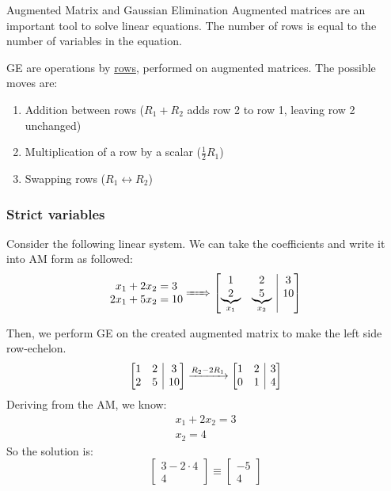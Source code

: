 \documentclass{article}
\makeatletter
\newenvironment{amatrix}[1]{%
  \left[\begin{array}{@{}*{#1}{c}|c@{}}
}{%
  \end{array}\right]
}
\makeatother
\begin{document}
\begin{knBox}[]{Augmented Matrix and Gaussian Elimination}
    Augmented matrices are an important tool to solve linear equations. The number of rows is equal to the number of variables in the equation. 

    GE are operations by \underline{rows}, performed on augmented matrices. The possible moves are:
    \begin{enumerate}
        \item Addition between rows ($R_1 + R_2$ adds row 2 to row 1, leaving row 2 unchanged)
        \item Multiplication of a row by a scalar ($\frac{1}{2}R_1$)
        \item Swapping rows ($R_1\leftrightarrow R_2$)
    \end{enumerate}
\end{knBox}

\subsubsection{Strict variables}
Consider the following linear system. We can take the coefficients and write it into AM form as followed:
\[
\begin{matrix}
    x_1 + 2x_2 = 3\\
    2x_1 + 5x_2 = 10
\end{matrix}\xRightarrow{\hspace{0.5cm}}
\begin{amatrix}{2}
    1 & 2 & 3 \\ \underbrace{2}_{x_1} & \underbrace{5}_{x_2} & 10
\end{amatrix}
\]

Then, we perform GE on the created augmented matrix to make the left side row-echelon.
\[
    \begin{amatrix}{2}
        1 & 2 & 3 \\ 2 & 5 & 10
    \end{amatrix} \xrightarrow{R_2-2R_1}
    \begin{amatrix}{2}
        1 & 2 & 3 \\ 0 & 1 & 4
    \end{amatrix}
\]
Deriving from the AM, we know:
\[
    \begin{matrix}
        x_1 + 2x_2 = 3\\
        x_2 = 4
    \end{matrix}
\]
So the solution is:
\[
    \begin{bmatrix}
        3-2\cdot 4\\
        4
    \end{bmatrix}\equiv
    \begin{bmatrix}
        -5\\
        4
    \end{bmatrix}
\]
\end{document}
